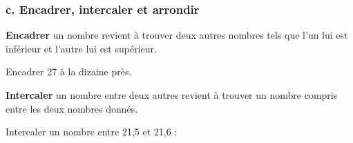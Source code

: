 \vspace{-0.5cm}
\subsubsection*{c. Encadrer, intercaler et arrondir}


\begin{Définition}[c]
\textbf{Encadrer} un nombre revient à trouver deux autres nombres tels que l'un lui est inférieur et l'autre lui est supérieur.
\end{Définition}

\begin{Exemple}
Encadrer 27 à la dizaine près.
\begin{center}
\end{center}
\vspace{-0.3cm}

\ligne

\ligne

\end{Exemple}

\begin{Définition}[c]
\textbf{Intercaler} un nombre entre deux autres revient à trouver un nombre compris entre les deux nombres donnés.
\end{Définition}

\begin{Exemple}
\begin{minipage}[c]{.7\textwidth}
Intercaler un nombre entre 21,5 et 21,6 : \ligne

\ligne


\end{minipage} \hfill \begin{minipage}[c]{.3\textwidth}
\begin{center}
\end{center}
\end{minipage}

\end{Exemple}

